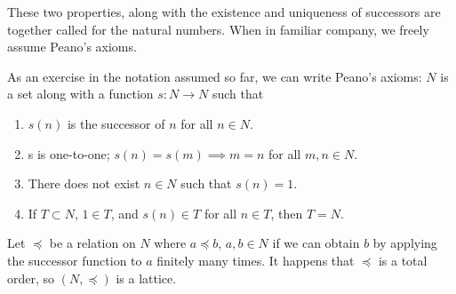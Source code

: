 These two properties, along with the existence
and uniqueness of successors are together called
 for the natural numbers.
When in familiar company, we freely assume Peano's axioms.


As an exercise in the notation assumed so far, we can write Peano's axioms: $N$ is a set along with a function $s: N \to N$ such that
\begin{enumerate}
  \item $s(n)$ is the successor of $n$ for all $n \in N$.
  \item s is one-to-one; $s(n) = s(m) \implies m = n$  for all $m, n \in N$.
  \item There does not exist $n \in N$ such that $s(n) = 1$.
  \item If $T \subset N$, $1 \in T$, and $s(n) \in T$ for all $n \in T$, then $T = N$.
\end{enumerate}


Let $\preceq$ be a relation on $N$ where $a \preceq b$, $a, b \in N$ if we can obtain $b$ by applying the successor function to $a$ finitely many times.
It happens that $\preceq$ is a total order, so $(N, \preceq)$ is a lattice.
\strats
